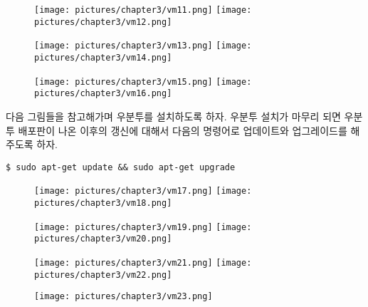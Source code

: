 \newpage

\begin{figure}[h]
\centering
\texttt{[image: pictures/chapter3/vm11.png]}
\texttt{[image: pictures/chapter3/vm12.png]}
\end{figure}

\begin{figure}[h]
\centering
\texttt{[image: pictures/chapter3/vm13.png]}
\texttt{[image: pictures/chapter3/vm14.png]}
\end{figure}

\begin{figure}[h]
\centering
\texttt{[image: pictures/chapter3/vm15.png]}
\texttt{[image: pictures/chapter3/vm16.png]}
\end{figure}

\newpage

\noindent
다음 그림들을 참고해가며 우분투를 설치하도록 하자. 우분투 설치가 마무리 되면 우분투 배포판이 나온 이후의 갱신에 대해서 다음의 명령어로 업데이트와 업그레이드를 해주도록 하자.

\vspace{\baselineskip}
\begin{lstlisting}[language=ROS]
$ sudo apt-get update && sudo apt-get upgrade
\end{lstlisting}

\begin{figure}[h]
\centering
\texttt{[image: pictures/chapter3/vm17.png]}
\texttt{[image: pictures/chapter3/vm18.png]}
\end{figure}

\begin{figure}[h]
\centering
\texttt{[image: pictures/chapter3/vm19.png]}
\texttt{[image: pictures/chapter3/vm20.png]}
\end{figure}

\begin{figure}[h]
\centering
\texttt{[image: pictures/chapter3/vm21.png]}
\texttt{[image: pictures/chapter3/vm22.png]}
\end{figure}

\newpage

\begin{figure}[h]
\centering
\texttt{[image: pictures/chapter3/vm23.png]}
\end{figure}

